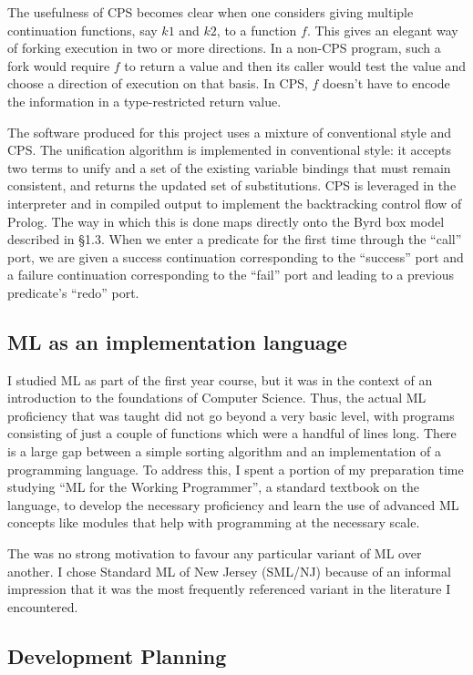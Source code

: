 \documentclass[12pt]{article}
\begin{document}
The usefulness of CPS becomes clear when one considers giving multiple continuation functions, say $k1$ and $k2$, to a function $f$. 
This gives an elegant way of forking execution in two or more directions. 
In a non-CPS program, such a fork would require $f$ to return a value and then its caller would test the value and choose a direction of execution on that basis. 
In CPS, $f$ doesn't have to encode the information in a type-restricted return value.

The software produced for this project uses a mixture of conventional style and CPS. 
The unification algorithm is implemented in conventional style: it accepts two terms to unify and a set of the existing variable bindings that must remain consistent, and returns the updated set of substitutions. 
CPS is leveraged in the interpreter and in compiled output to implement the backtracking control flow of Prolog.
The way in which this is done maps directly onto the Byrd box model described in \S1.3. When we enter a predicate for the first time through the ``call'' port, we are given a success continuation corresponding to the ``success'' port and a failure continuation corresponding to the ``fail'' port and leading to a previous predicate's ``redo'' port.

\subsection{ML as an implementation language}

I studied ML as part of the first year course, but it was in the context of an introduction to the foundations of Computer Science. 
Thus, the actual ML proficiency that was taught did not go beyond a very basic level, with programs consisting of just a couple of functions which were a handful of lines long. 
There is a large gap between a simple sorting algorithm and an implementation of a programming language. 
To address this, I spent a portion of my preparation time studying ``ML for the Working Programmer'', a standard textbook on the language, to develop the necessary proficiency and learn the use of advanced ML concepts like modules that help with programming at the necessary scale.

The was no strong motivation to favour any particular variant of ML over another.
I chose Standard ML of New Jersey (SML/NJ) because of an informal impression that it was the most frequently referenced variant in the literature I encountered.

\subsection*{Development Planning}
\end{document}
